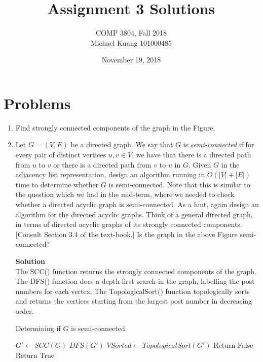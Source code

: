 \documentclass[12pt]{article}
\title{Assignment 3 Solutions}
\author{COMP 3804, Fall 2018 \\
	Michael Kuang 101000485}
\date{November 19, 2018}
\begin{document}
\maketitle

\newpage

\section{Problems}

\begin{enumerate}
\item Find strongly connected components of the graph in the Figure.

\begin{center}

\end{center}


\item \color{blue} Let $G=(V,E)$ be a directed graph. We say that $G$ is {\em semi-connected} if for every pair of distinct vertices $u,v\in V$,  we have that there is a directed path from $u$ to $v$ or there is a directed path from $v$ to $u$ in $G$.  Given $G$ in the adjacency list representation, design an algorithm running in $O(|V|+|E|)$ time to determine whether $G$ is semi-connected. Note that this is similar to the question which we had in the mid-term, where we needed to check whether a directed acyclic graph is semi-connected.  As a hint, again design an algorithm for the directed acyclic graphs. Think of a general directed graph, in terms of directed acyclic graphs of its strongly connected components. [Consult Section 3.4 of the text-book.] 
Is the graph in the above Figure semi-connected?


\color{black}
\textbf{Solution}\\
The SCC() function returns the strongly connected components of the graph.
The DFS() function does a depth-first search in the graph, labelling the post numbers for each vertex.
The TopologicalSort() function topologically sorts and returns the vertices starting from the largest post number in decreasing order.

\begin{algorithm}
\caption{Determining if $G$ is semi-connected}
\begin{algorithmic}[1]
	\State $G'\gets SCC(G)$ 
	\State $DFS(G')$ 
	\State $VSorted \gets TopologicalSort(G')$ 
			\State Return False
		\EndIf
	\EndFor
	\State Return True
\EndProcedure
\end{algorithmic}
\end{algorithm}


\end{enumerate}
\end{document}
